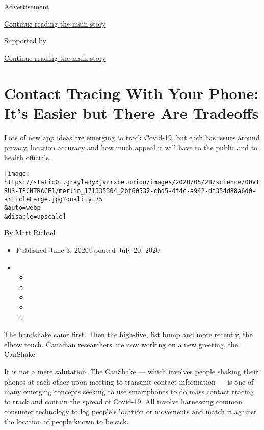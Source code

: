 Advertisement

\protect\hyperlink{after-top}{Continue reading the main story}

Supported by

\protect\hyperlink{after-sponsor}{Continue reading the main story}

\hypertarget{contact-tracing-with-your-phone-its-easier-but-there-are-tradeoffs}{%
\section{Contact Tracing With Your Phone: It's Easier but There Are
Tradeoffs}\label{contact-tracing-with-your-phone-its-easier-but-there-are-tradeoffs}}

Lots of new app ideas are emerging to track Covid-19, but each has
issues around privacy, location accuracy and how much appeal it will
have to the public and to health officials.

\texttt{[image: https://static01.graylady3jvrrxbe.onion/images/2020/05/28/science/00VIRUS-TECHTRACE1/merlin\_171335304\_2bf60532-cbd5-4f4c-a942-df354d88a6d0-articleLarge.jpg?quality=75\\\&auto=webp\\\&disable=upscale]}

By \href{https://www.nytimes3xbfgragh.onion/by/matt-richtel}{Matt
Richtel}

\begin{itemize}
\item
  Published June 3, 2020Updated July 20, 2020
\item
  \begin{itemize}
  \item
  \item
  \item
  \item
  \item
  \end{itemize}
\end{itemize}

The handshake came first. Then the high-five, fist bump and more
recently, the elbow touch. Canadian researchers are now working on a new
greeting, the CanShake.

It is not a mere salutation. The CanShake --- which involves people
shaking their phones at each other upon meeting to transmit contact
information --- is one of many emerging concepts seeking to use
smartphones to do mass
\href{https://www.nytimes3xbfgragh.onion/2020/06/21/nyregion/nyc-contact-tracing.html}{contact
tracing} to track and contain the spread of Covid-19. All involve
harnessing common consumer technology to log people's location or
movements and match it against the location of people known to be sick.

